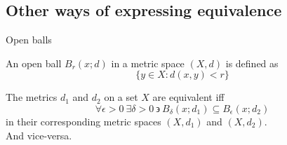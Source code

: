 \documentclass{beamer}
\begin{document}
\subsection{Other ways of expressing equivalence}
\begin{frame}{Open balls}

    \begin{definition}{}
        An open ball $B_r(x;d)$ in a metric space $(X,d)$ is defined as
        \[
            \{y \in X : d(x,y) < r\}
        \]
    \end{definition}

    \pause{}

    \begin{theorem}{}
        The metrics $d_1$ and $d_2$ on a set $X$ are equivalent iff
        \[
            \forall \epsilon > 0 \ \exists \delta > 0 \ \backepsilon
            \ B_\delta(x;d_1) \subseteq
            B_\epsilon(x;d_2)
        \]
        in their corresponding metric spaces $(X,d_1)$ and $(X,d_2)$.\\
        And vice-versa.
    \end{theorem}

\end{frame}
\end{document}
